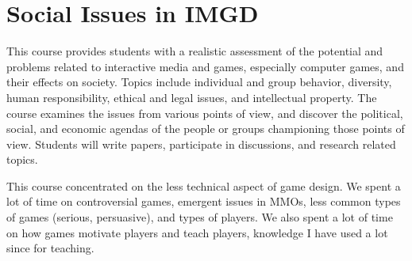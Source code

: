 \section{Social Issues in IMGD}

\begin{meta}
\end{meta}

\coursedesc
This course provides students with a realistic assessment of the
potential and problems related to interactive media and games,
especially computer games, and their effects on society. Topics include
individual and group behavior, diversity, human responsibility, ethical
and legal issues, and intellectual property. The course examines the
issues from various points of view, and discover the political, social,
and economic agendas of the people or groups championing those points
of view. Students will write papers, participate in discussions, and
research related topics.

\courseself
This course concentrated on the less technical aspect of game design.
We spent a lot of time on controversial games, emergent issues in MMOs,
less common types of games (serious, persuasive), and types of players.
We also spent a lot of time on how games motivate players and teach
players, knowledge I have used a lot since for teaching.


